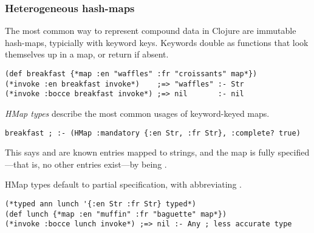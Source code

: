 %
%
%

\subsubsection{Heterogeneous hash-maps}

The most common way to represent compound data in Clojure 
are immutable hash-maps, typicially with keyword keys.
%
Keywords double as functions that
look themselves up in a map, or return  if absent.
%
\begin{exmp}
\begin{lstlisting}
(def breakfast {*map :en "waffles" :fr "croissants" map*})
(*invoke :en breakfast invoke*)    ;=> "waffles" :- Str
(*invoke :bocce breakfast invoke*) ;=> nil       :- nil
\end{lstlisting}
\label{example:breakfastcomplete}
\end{exmp}

\emph{HMap types} describe the most common usages of
keyword-keyed maps.
\begin{lstlisting}
breakfast ; :- (HMap :mandatory {:en Str, :fr Str}, :complete? true)
\end{lstlisting}
This says
 and  are known entries mapped to strings,
and the map is fully specified---that is, no other entries exist---by  being .

HMap types default to partial specification, with
 abbreviating .
%
\begin{exmp}
\begin{lstlisting}
(*typed ann lunch '{:en Str :fr Str} typed*)
(def lunch {*map :en "muffin" :fr "baguette" map*})
(*invoke :bocce lunch invoke*) ;=> nil :- Any ; less accurate type
\end{lstlisting}
\label{example:lunchpartial}
\end{exmp}

